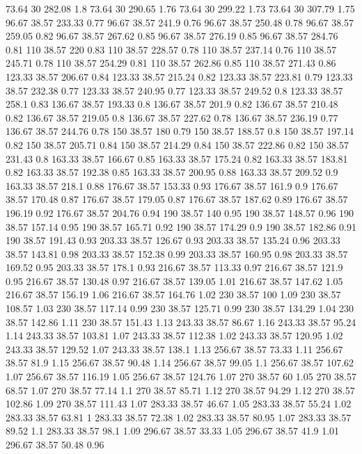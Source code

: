 73.64	30	282.08	1.8
73.64	30	290.65	1.76
73.64	30	299.22	1.73
73.64	30	307.79	1.75
96.67	38.57	233.33	0.77
96.67	38.57	241.9	0.76
96.67	38.57	250.48	0.78
96.67	38.57	259.05	0.82
96.67	38.57	267.62	0.85
96.67	38.57	276.19	0.85
96.67	38.57	284.76	0.81
110	38.57	220	0.83
110	38.57	228.57	0.78
110	38.57	237.14	0.76
110	38.57	245.71	0.78
110	38.57	254.29	0.81
110	38.57	262.86	0.85
110	38.57	271.43	0.86
123.33	38.57	206.67	0.84
123.33	38.57	215.24	0.82
123.33	38.57	223.81	0.79
123.33	38.57	232.38	0.77
123.33	38.57	240.95	0.77
123.33	38.57	249.52	0.8
123.33	38.57	258.1	0.83
136.67	38.57	193.33	0.8
136.67	38.57	201.9	0.82
136.67	38.57	210.48	0.82
136.67	38.57	219.05	0.8
136.67	38.57	227.62	0.78
136.67	38.57	236.19	0.77
136.67	38.57	244.76	0.78
150	38.57	180	0.79
150	38.57	188.57	0.8
150	38.57	197.14	0.82
150	38.57	205.71	0.84
150	38.57	214.29	0.84
150	38.57	222.86	0.82
150	38.57	231.43	0.8
163.33	38.57	166.67	0.85
163.33	38.57	175.24	0.82
163.33	38.57	183.81	0.82
163.33	38.57	192.38	0.85
163.33	38.57	200.95	0.88
163.33	38.57	209.52	0.9
163.33	38.57	218.1	0.88
176.67	38.57	153.33	0.93
176.67	38.57	161.9	0.9
176.67	38.57	170.48	0.87
176.67	38.57	179.05	0.87
176.67	38.57	187.62	0.89
176.67	38.57	196.19	0.92
176.67	38.57	204.76	0.94
190	38.57	140	0.95
190	38.57	148.57	0.96
190	38.57	157.14	0.95
190	38.57	165.71	0.92
190	38.57	174.29	0.9
190	38.57	182.86	0.91
190	38.57	191.43	0.93
203.33	38.57	126.67	0.93
203.33	38.57	135.24	0.96
203.33	38.57	143.81	0.98
203.33	38.57	152.38	0.99
203.33	38.57	160.95	0.98
203.33	38.57	169.52	0.95
203.33	38.57	178.1	0.93
216.67	38.57	113.33	0.97
216.67	38.57	121.9	0.95
216.67	38.57	130.48	0.97
216.67	38.57	139.05	1.01
216.67	38.57	147.62	1.05
216.67	38.57	156.19	1.06
216.67	38.57	164.76	1.02
230	38.57	100	1.09
230	38.57	108.57	1.03
230	38.57	117.14	0.99
230	38.57	125.71	0.99
230	38.57	134.29	1.04
230	38.57	142.86	1.11
230	38.57	151.43	1.13
243.33	38.57	86.67	1.16
243.33	38.57	95.24	1.14
243.33	38.57	103.81	1.07
243.33	38.57	112.38	1.02
243.33	38.57	120.95	1.02
243.33	38.57	129.52	1.07
243.33	38.57	138.1	1.13
256.67	38.57	73.33	1.11
256.67	38.57	81.9	1.15
256.67	38.57	90.48	1.14
256.67	38.57	99.05	1.1
256.67	38.57	107.62	1.07
256.67	38.57	116.19	1.05
256.67	38.57	124.76	1.07
270	38.57	60	1.05
270	38.57	68.57	1.07
270	38.57	77.14	1.1
270	38.57	85.71	1.12
270	38.57	94.29	1.12
270	38.57	102.86	1.09
270	38.57	111.43	1.07
283.33	38.57	46.67	1.05
283.33	38.57	55.24	1.02
283.33	38.57	63.81	1
283.33	38.57	72.38	1.02
283.33	38.57	80.95	1.07
283.33	38.57	89.52	1.1
283.33	38.57	98.1	1.09
296.67	38.57	33.33	1.05
296.67	38.57	41.9	1.01
296.67	38.57	50.48	0.96
